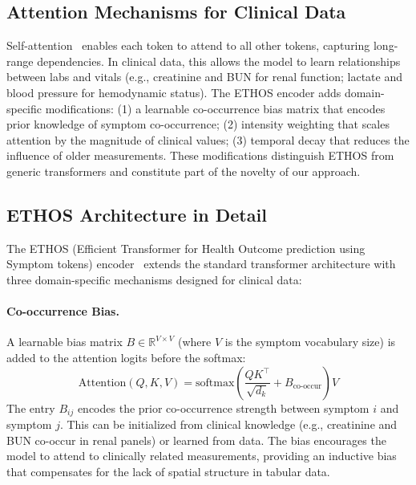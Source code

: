 \subsection{Attention Mechanisms for Clinical Data}

Self-attention~\cite{vaswani2017attention} enables each token to attend to all other tokens, capturing long-range dependencies. In clinical data, this allows the model to learn relationships between labs and vitals (e.g., creatinine and BUN for renal function; lactate and blood pressure for hemodynamic status). The ETHOS encoder adds domain-specific modifications: (1) a learnable co-occurrence bias matrix that encodes prior knowledge of symptom co-occurrence; (2) intensity weighting that scales attention by the magnitude of clinical values; (3) temporal decay that reduces the influence of older measurements. These modifications distinguish ETHOS from generic transformers and constitute part of the novelty of our approach.

\subsection{ETHOS Architecture in Detail}

The ETHOS (Efficient Transformer for Health Outcome prediction using Symptom tokens) encoder~\cite{sharafi2023ethos} extends the standard transformer architecture with three domain-specific mechanisms designed for clinical data:

\paragraph{Co-occurrence Bias.} A learnable bias matrix $B \in \mathbb{R}^{V \times V}$ (where $V$ is the symptom vocabulary size) is added to the attention logits before the softmax:
\begin{equation}
\text{Attention}(Q, K, V) = \text{softmax}\left(\frac{QK^\top}{\sqrt{d_k}} + B_{\text{co-occur}}\right) V
\end{equation}
The entry $B_{ij}$ encodes the prior co-occurrence strength between symptom $i$ and symptom $j$. This can be initialized from clinical knowledge (e.g., creatinine and BUN co-occur in renal panels) or learned from data. The bias encourages the model to attend to clinically related measurements, providing an inductive bias that compensates for the lack of spatial structure in tabular data.

